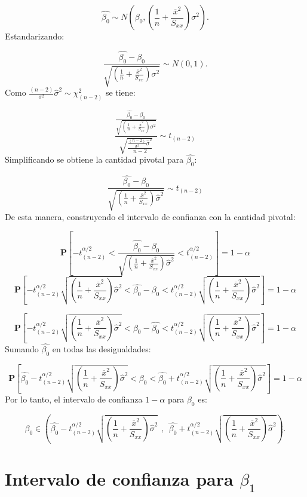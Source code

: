\documentclass[a4paper,oneside,openany]{book}
\begin{document}
\[\hat{\beta_{0}} \sim N \left( \beta_{0},\left(\frac{1}{n}+\frac{\overline{x}^2}{S_{xx}}\right)\sigma^2\right).\]
Estandarizando:

\[\frac{\hat{\beta_{0}}-\beta_{0}}{\sqrt{\left(\frac{1}{n}+\frac{\overline{x}^2}{S_{xx}}\right)\sigma^2}}\sim N (0,1).\]
Como \(\frac{(n-2)}{\sigma^2}\hat{\sigma}^2\sim\chi^2_{(n-2)}\) se
tiene:

\[\frac{\frac{\hat{\beta_{0}}-\beta_{0}}{\sqrt{\left(\frac{1}{n}+\frac{\overline{x}^2}{S_{xx}}\right)\sigma^2}}}{\sqrt{\frac{\frac{(n-2)}{\sigma^2}\hat{\sigma}^2}{n-2}}}\sim t_{(n-2)}\]
Simplificando se obtiene la cantidad pivotal para \(\hat{\beta_{0}}:\)

\[\frac{\hat{\beta_{0}}-\beta_{0}}{\sqrt{\left(\frac{1}{n}+\frac{\overline{x}^2}{S_{xx}}\right)\hat{\sigma}^2}} \sim t_{(n-2)}\]
De esta manera, construyendo el intervalo de confianza con la cantidad
pivotal:

\[\mathbf{P}\left[-t^{\alpha/2}_{(n-2)}<\frac{\hat{\beta_{0}}-\beta_{0}}{\sqrt{\left(\frac{1}{n}+\frac{\overline{x}^2}{S_{xx}}\right)\hat{\sigma}^2}}< t^{\alpha/2}_{(n-2)}\right]=1-\alpha\]
\[\mathbf{P}\left[-t^{\alpha/2}_{(n-2)}\sqrt{\left(\frac{1}{n}+\frac{\overline{x}^2}{S_{xx}}\right)\hat{\sigma}^2}<\hat{\beta_{0}}-\beta_{0}< t^{\alpha/2}_{(n-2)}\sqrt{\left(\frac{1}{n}+\frac{\overline{x}^2}{S_{xx}}\right)\hat{\sigma}^2}\right]=1-\alpha\]

\[\mathbf{P}\left[-t^{\alpha/2}_{(n-2)}\sqrt{\left(\frac{1}{n}+\frac{\overline{x}^2}{S_{xx}}\right)\hat{\sigma}^2}<\beta_{0}-\hat{\beta_{0}}< t^{\alpha/2}_{(n-2)}\sqrt{\left(\frac{1}{n}+\frac{\overline{x}^2}{S_{xx}}\right)\hat{\sigma}^2}\right]=1-\alpha\]
Sumando \(\hat{\beta_{0}}\) en todas las desigualdades:

\[\mathbf{P}\left[\hat{\beta_{0}}-t^{\alpha/2}_{(n-2)}\sqrt{\left(\frac{1}{n}+\frac{\overline{x}^2}{S_{xx}}\right)\hat{\sigma}^2}<\beta_{0}< \hat{\beta_{0}}+t^{\alpha/2}_{(n-2)}\sqrt{\left(\frac{1}{n}+\frac{\overline{x}^2}{S_{xx}}\right)\hat{\sigma}^2}\right]=1-\alpha\]
Por lo tanto, el intervalo de confianza \(1-\alpha\) para \(\beta_{0}\)
es:

\[\beta_{0} \in \left( \hat{\beta_{0}}-t^{\alpha/2}_{(n-2)}\sqrt{\left(\frac{1}{n}+\frac{\overline{x}^2}{S_{xx}}\right)\hat{\sigma}^2} \ \ , \ \ \hat{\beta_{0}}+t^{\alpha/2}_{(n-2)}\sqrt{\left(\frac{1}{n}+\frac{\overline{x}^2}{S_{xx}}\right)\hat{\sigma}^2} \right).\]

\section{\texorpdfstring{Intervalo de confianza para
\(\beta_{1}\)}{Intervalo de confianza para \textbackslash{}beta\_\{1\}}}\label{intervalo-de-confianza-para-beta_1}
\end{document}
